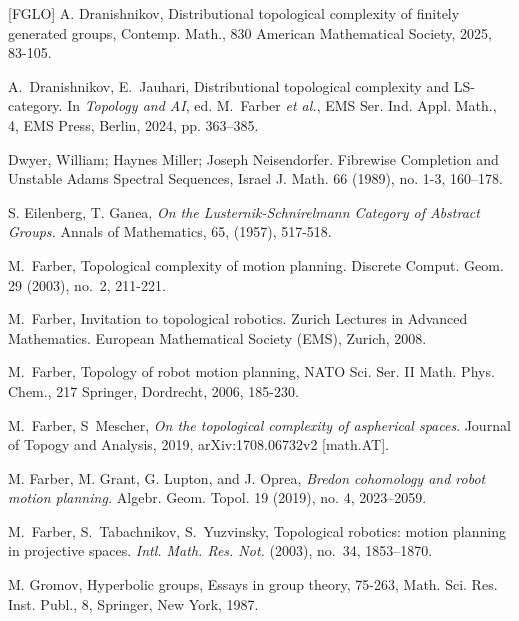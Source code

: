 \documentclass{amsart}
\numberwithin{equation}{section}
\theoremstyle{plain}
\theoremstyle{definition}
\begin{document}
\begin{thebibliography}{[FGLO]}
 A. Dranishnikov,  Distributional topological complexity of finitely generated groups, Contemp. Math., 830 American Mathematical Society, 2025, 83-105.

 
 A.~Dranishnikov, E.~Jauhari, Distributional topological complexity and LS-category. In \emph{Topology and AI}, ed. M.~Farber \emph{et al.}, EMS Ser. Ind. Appl. Math., 4, EMS Press, Berlin, 2024, pp. 363–385. 



 Dwyer, William; Haynes Miller; Joseph Neisendorfer. 
  Fibrewise Completion and Unstable Adams Spectral Sequences,
 Israel J. Math. 66 (1989), no. 1-3, 160–178.

 S. Eilenberg, T. Ganea, {\em On the Lusternik-Schnirelmann Category of Abstract Groups.} Annals of
Mathematics, 65, (1957), 517-518.


 M.~Farber, Topological complexity of motion planning. Discrete Comput. Geom. 29 (2003), no.~2, 211-221. 


 M.~Farber, Invitation to topological robotics. Zurich Lectures in Advanced Mathematics. European Mathematical Society (EMS), Zurich, 2008. 

 M.~Farber, Topology of robot motion planning, NATO Sci. Ser. II Math. Phys. Chem., 217
Springer, Dordrecht, 2006, 185-230.


 M.~Farber, S~Mescher, {\em On the topological complexity of aspherical spaces}. Journal of Topogy and Analysis, 2019, arXiv:1708.06732v2 [math.AT].

 M. Farber, M. Grant, G. Lupton, and J. Oprea, {\em Bredon cohomology and robot motion planning.} Algebr. Geom. Topol. 19 (2019), no. 4, 2023–2059.

  M.~Farber, S.~Tabachnikov, S.~Yuzvinsky, Topological robotics: motion planning in projective spaces. \emph{Intl. Math. Res. Not.} (2003), no.~34, 1853--1870.

 M. Gromov, Hyperbolic groups, Essays in group theory, 75-263, Math. Sci. Res. Inst. Publ., 8, Springer, New York, 1987.


\end{thebibliography}
\end{document}
